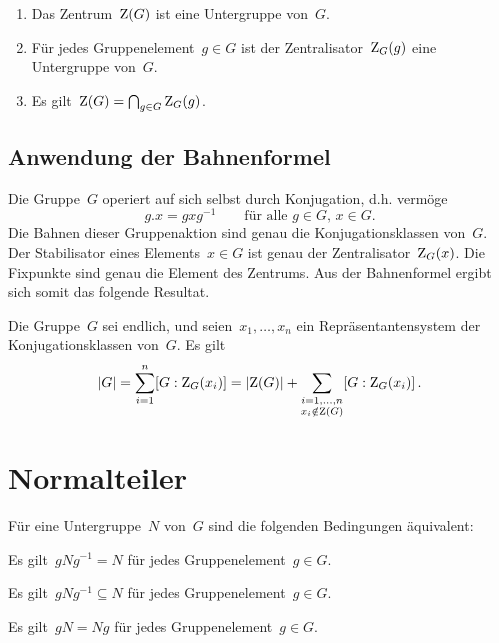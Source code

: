 \begin{proposition}
  \leavevmode
  \begin{enumerate}
    \item
      Das Zentrum~$\operatorname{Z}(G)$ ist eine Untergruppe von~$G$.
    \item
      Für jedes Gruppenelement~$g \in G$ ist der Zentralisator~$\operatorname{Z}_G(g)$ eine Untergruppe von~$G$.
    \item
      Es gilt~$\operatorname{Z}(G) = \bigcap_{g \in G} \operatorname{Z}_G(g)$.
  \end{enumerate}
\end{proposition}



\subsection{Anwendung der Bahnenformel}

Die Gruppe~$G$ operiert auf sich selbst durch Konjugation, d.h. vermöge
\[
  g.x = g x g^{-1}
  \qquad
  \text{für alle~$g \in G$,~$x \in G$.}
\]
Die Bahnen dieser Gruppenaktion sind genau die Konjugationsklassen von~$G$.
Der Stabilisator eines Elements~$x \in G$ ist genau der Zentralisator~$\operatorname{Z}_G(x)$.
Die Fixpunkte sind genau die Element des Zentrums.
Aus der Bahnenformel ergibt sich somit das folgende Resultat.

\begin{theorem}[Klassenformel]
  Die Gruppe~$G$ sei endlich, und seien~$x_1, \dotsc, x_n$ ein Repräsentantensystem der Konjugationsklassen von~$G$.
  Es gilt
  \[
    \lvert G\rvert
    =
    \sum_{i=1}^n [G : \operatorname{Z}_G(x_i)]
    =
    \lvert \operatorname{Z}(G) \rvert
    +
    \sum_{\substack{i = 1, \dotsc, n \\ x_i \notin \operatorname{Z}(G)}}
    [G : \operatorname{Z}_G(x_i)] \,.
  \]
\end{theorem}



\section{Normalteiler}

\begin{proposition}
  \label{characterizations of normal subgroups}
  Für eine Untergruppe~$N$ von~$G$ sind die folgenden Bedingungen äquivalent:
  \begin{equivlist}
    \item
      Es gilt~$g N g^{-1} = N$ für jedes Gruppenelement~$g \in G$.
    \item
      Es gilt~$g N g^{-1} \subseteq N$ für jedes Gruppenelement~$g \in G$.
    \item
      Es gilt~$gN = Ng$ für jedes Gruppenelement~$g \in G$.
  \end{equivlist}
\end{proposition}

